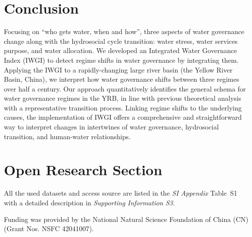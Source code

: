 \documentclass[draft]{../agujournal2019}
\begin{document}
\section{Conclusion}\label{sec13}
Focusing on ``who gets water, when and how'', three aspects of water governance change along with the hydrosocial cycle transition: water stress, water services purpose, and water allocation. We developed an Integrated Water Governance Index (IWGI) to detect regime shifts in water governance by integrating them. Applying the IWGI to a rapidly-changing large river basin (the Yellow River Basin, China), we interpret how water governance shifts between three regimes over half a century. Our approach quantitatively identifies the general schema for water governance regimes in the YRB, in line with previous theoretical analysis with a representative transition process. Linking regime shifts to the underlying causes, the implementation of IWGI offers a comprehensive and straightforward way to interpret changes in intertwines of water governance, hydrosocial transition, and human-water relationships.
























\section*{Open Research Section}
All the used datasets and access source are listed in the \textit{SI Appendix} Table~S1 with a detailed description in \textit{Supporting Information S3}.



\acknowledgments
Funding was provided by the National Natural Science Foundation of China (CN) (Grant Nos. NSFC 42041007).


\end{document}
